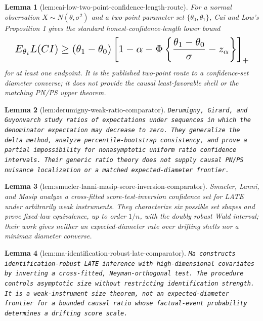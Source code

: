 \documentclass{article}
\newtheorem{lemma}{Lemma}
\begin{document}
\begin{lemma}[lem:cai-low-two-point-confidence-length-route]\label{lem:cai-low-two-point-confidence-length-route}
For a normal observation \(X\sim N(\theta,\sigma^2)\) and a two-point parameter set \(\{\theta_0,\theta_1\}\), Cai and Low's Proposition 1 gives the standard honest-confidence-length lower bound
\[
\makebox[\linewidth][c]{\resizebox{0.98\linewidth}{!}{\par\noindent \makebox[\linewidth][c]{\resizebox{0.98\linewidth}{!}{\(\displaystyle \displaystyle E_{\theta_i}L(CI)\ge(\theta_1-\theta_0)\left[1-\alpha-\Phi\left\{\frac{\theta_1-\theta_0}{\sigma}-z_\alpha\right\}\right]_+\)}}\par\noindent}}
\]
for at least one endpoint. It is the published two-point route to a confidence-set diameter converse; it does not provide the causal least-favorable shell or the matching PN/PS upper theorem.
\end{lemma}

\begin{lemma}[lem:derumigny-weak-ratio-comparator]\label{lem:derumigny-weak-ratio-comparator}
\texttt{Derumigny,\allowbreak{} Girard,\allowbreak{} and Guyonvarch study ratios of expectations under sequences in which the denominator expectation may decrease to zero. They generalize the delta method,\allowbreak{} analyze percentile-\allowbreak{}bootstrap consistency,\allowbreak{} and prove a partial impossibility for nonasymptotic uniform ratio confidence intervals. Their generic ratio theory does not supply causal PN/\allowbreak{}PS nuisance localization or a matched expected-\allowbreak{}diameter frontier.}
\end{lemma}

\begin{lemma}[lem:smucler-lanni-masip-score-inversion-comparator]\label{lem:smucler-lanni-masip-score-inversion-comparator}
Smucler, Lanni, and Masip analyze a cross-fitted score-test-inversion confidence set for LATE under arbitrarily weak instruments. They characterize six possible set shapes and prove fixed-law equivalence, up to order \(1/n\), with the doubly robust Wald interval; their work gives neither an expected-diameter rate over drifting shells nor a minimax diameter converse.
\end{lemma}

\begin{lemma}[lem:ma-identification-robust-late-comparator]\label{lem:ma-identification-robust-late-comparator}
\texttt{Ma constructs identification-\allowbreak{}robust LATE inference with high-\allowbreak{}dimensional covariates by inverting a cross-\allowbreak{}fitted,\allowbreak{} Neyman-\allowbreak{}orthogonal test. The procedure controls asymptotic size without restricting identification strength. It is a weak-\allowbreak{}instrument size theorem,\allowbreak{} not an expected-\allowbreak{}diameter frontier for a bounded causal ratio whose factual-\allowbreak{}event probability determines a drifting score scale.}
\end{lemma}
\end{document}
